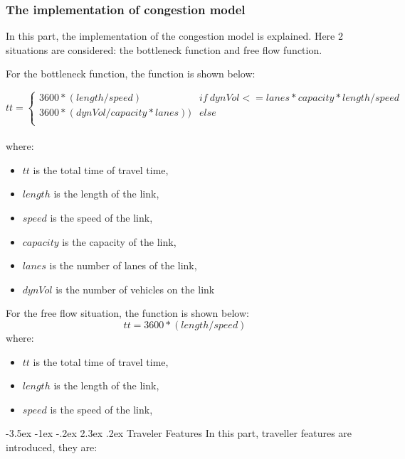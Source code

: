 \documentclass[a4paper, 12pt,oneside]{article}
\makeatletter
\renewcommand{\subsection}{\@startsection {subsection}{1}{\z@}%
             {-3.5ex \@plus -1ex \@minus -.2ex}%
             {2.3ex \@plus.2ex}%
             {\normalfont\normalsize\bfseries}}
\makeatother
\begin{document}
\subsubsection{The implementation of congestion model}

In this part, the implementation of the congestion model is explained. Here 2 situations are considered: the bottleneck function and free flow function.

For the bottleneck function, the function is shown below:


\begin{equation}
    
tt=
\left\{
\begin{array}{cc}
   3600*(length/speed) & if \ dynVol<= lanes* capacity * length/speed  \\
   3600*(dynVol/capacity*lanes)) & else\\
\end{array}
\right.
\end{equation}
\\
where:
\begin{itemize}
    \item $tt$ is the total time of travel time,
    \item $length$ is the length of the link,
    \item $speed$ is the speed of the link,
    \item $capacity$ is the capacity of the link,
    \item $ lanes$ is the number of lanes of the link,
    \item $dynVol$ is the number of vehicles on the link
\end{itemize}
For the free flow situation, the function is shown below:
\begin{equation}
    tt=3600*(length/speed)
\end{equation}
where:
\begin{itemize}
    \item $tt$ is the total time of travel time,
    \item $length$ is the length of the link,
    \item $speed$ is the speed of the link,
    
\end{itemize}
\subsection{Traveler Features}
In this part, traveller features are introduced, they are:
\end{document}
